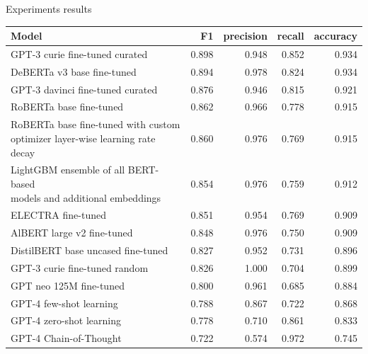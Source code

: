 \documentclass[aspectratio=149]{beamer}
\begin{document}
\begin{frame}{Experiments results}
\fontsize{9pt}{10pt}\selectfont
\begin{table}[!htb]
    \centering
    \label{tab:results}
    \begin{tabular}{lrrrr}
        \toprule
        Model                              & F1    & precision & recall & accuracy \\
        \midrule
        GPT-3 curie fine-tuned curated     & 0.898 & 0.948     & 0.852  & 0.934    \\
        DeBERTa v3 base fine-tuned         & 0.894 & 0.978     & 0.824  & 0.934    \\
        GPT-3 davinci fine-tuned curated   & 0.876 & 0.946     & 0.815  & 0.921    \\
        RoBERTa base fine-tuned            & 0.862 & 0.966     & 0.778  & 0.915    \\
        \makecell[l]{RoBERTa base fine-tuned with custom                           \\optimizer layer-wise learning rate decay} & 0.860 &      0.976 &   0.769 &     0.915 \\
        \makecell[l]{LightGBM ensemble of all BERT-based                           \\models and additional embeddings} & 0.854 &      0.976 &   0.759 &     0.912 \\
        ELECTRA fine-tuned                 & 0.851 & 0.954     & 0.769  & 0.909    \\
        AlBERT large v2 fine-tuned         & 0.848 & 0.976     & 0.750  & 0.909    \\
        DistilBERT base uncased fine-tuned & 0.827 & 0.952     & 0.731  & 0.896    \\
        GPT-3 curie fine-tuned random      & 0.826 & 1.000     & 0.704  & 0.899    \\
        GPT neo 125M fine-tuned            & 0.800 & 0.961     & 0.685  & 0.884    \\
        GPT-4 few-shot learning            & 0.788 & 0.867     & 0.722  & 0.868    \\
        GPT-4 zero-shot learning           & 0.778 & 0.710     & 0.861  & 0.833    \\
        GPT-4 Chain-of-Thought             & 0.722 & 0.574     & 0.972  & 0.745    \\
        \bottomrule
    \end{tabular}

\end{table}
\end{frame}
\end{document}
